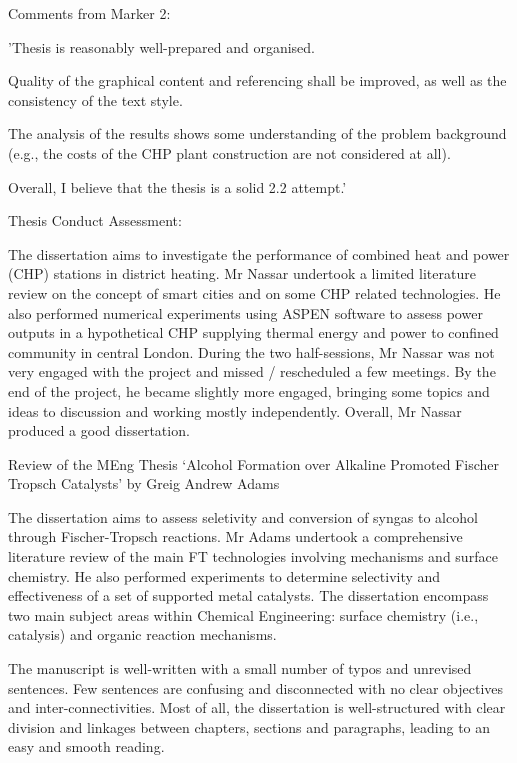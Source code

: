 \documentclass[14pt,twoside]{report}
\begin{document}
\bigskip
\noindent
{\Large Comments from Marker 2:}

'Thesis is reasonably well-prepared and organised.

Quality of the graphical content and referencing shall be improved, as well as the consistency of the text style.

The analysis of the results shows some understanding of the problem background (e.g., the costs of the CHP plant construction are not considered at all).

Overall, I believe that the thesis is a solid 2.2 attempt.'

\clearpage
\noindent
{\Large Thesis Conduct Assessment:}

The dissertation aims to investigate the performance of combined heat and power (CHP) stations in district heating. Mr Nassar undertook a limited literature review on the concept of smart cities and on some CHP related technologies. He also performed numerical experiments using ASPEN software to assess power outputs in a hypothetical CHP supplying thermal energy and power to confined community in central London. During the two half-sessions, Mr Nassar was not very engaged with the project and missed / rescheduled a few meetings. By the end of the project, he became slightly more engaged, bringing some topics and ideas to discussion and working mostly independently. Overall, Mr Nassar produced a good dissertation.

\vfill
\clearpage




\bigskip

\begin{center}
  {\Large Review of the MEng Thesis `Alcohol Formation over Alkaline Promoted Fischer Tropsch Catalysts' by Greig Andrew Adams}
\end{center}
The dissertation aims to assess seletivity and conversion of syngas to alcohol through Fischer-Tropsch reactions. Mr Adams undertook a comprehensive literature review of the main FT technologies involving mechanisms and surface chemistry. He also performed experiments to determine selectivity and effectiveness of a set of supported metal catalysts. The dissertation encompass two main subject areas within Chemical Engineering: surface chemistry (i.e., catalysis) and organic reaction mechanisms.

The manuscript is well-written with a small number of typos and unrevised sentences. Few sentences are confusing and disconnected with no clear objectives and inter-connectivities. Most of all, the dissertation is well-structured with clear division and linkages between chapters, sections and paragraphs, leading to an easy and smooth reading.
\end{document}
